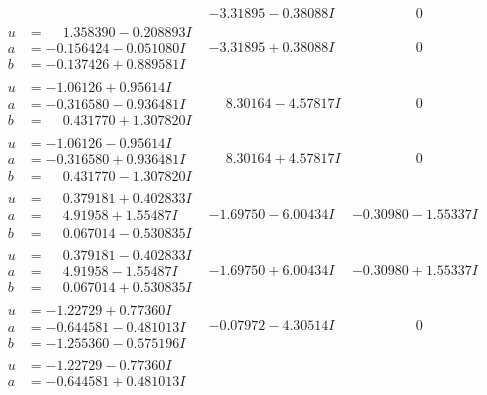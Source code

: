 \documentclass[1p]{elsarticle_modified}
\theoremstyle{definition}
\begin{document}
$$\begin{array}{c|c|c}
 & -3.31895 - 0.38088 I & \phantom{-0.000000 } 0 \\ \hline\begin{aligned}
u &= \phantom{-}1.358390 - 0.208893 I \\
a &= -0.156424 - 0.051080 I \\
b &= -0.137426 + 0.889581 I\end{aligned}
 & -3.31895 + 0.38088 I & \phantom{-0.000000 } 0 \\ \hline\begin{aligned}
u &= -1.06126 + 0.95614 I \\
a &= -0.316580 - 0.936481 I \\
b &= \phantom{-}0.431770 + 1.307820 I\end{aligned}
 & \phantom{-}8.30164 - 4.57817 I & \phantom{-0.000000 } 0 \\ \hline\begin{aligned}
u &= -1.06126 - 0.95614 I \\
a &= -0.316580 + 0.936481 I \\
b &= \phantom{-}0.431770 - 1.307820 I\end{aligned}
 & \phantom{-}8.30164 + 4.57817 I & \phantom{-0.000000 } 0 \\ \hline\begin{aligned}
u &= \phantom{-}0.379181 + 0.402833 I \\
a &= \phantom{-}4.91958 + 1.55487 I \\
b &= \phantom{-}0.067014 - 0.530835 I\end{aligned}
 & -1.69750 - 6.00434 I & -0.30980 - 1.55337 I \\ \hline\begin{aligned}
u &= \phantom{-}0.379181 - 0.402833 I \\
a &= \phantom{-}4.91958 - 1.55487 I \\
b &= \phantom{-}0.067014 + 0.530835 I\end{aligned}
 & -1.69750 + 6.00434 I & -0.30980 + 1.55337 I \\ \hline\begin{aligned}
u &= -1.22729 + 0.77360 I \\
a &= -0.644581 - 0.481013 I \\
b &= -1.255360 - 0.575196 I\end{aligned}
 & -0.07972 - 4.30514 I & \phantom{-0.000000 } 0 \\ \hline\begin{aligned}
u &= -1.22729 - 0.77360 I \\
a &= -0.644581 + 0.481013 I \\

\end{aligned}
\end{array}$$
\end{document}
